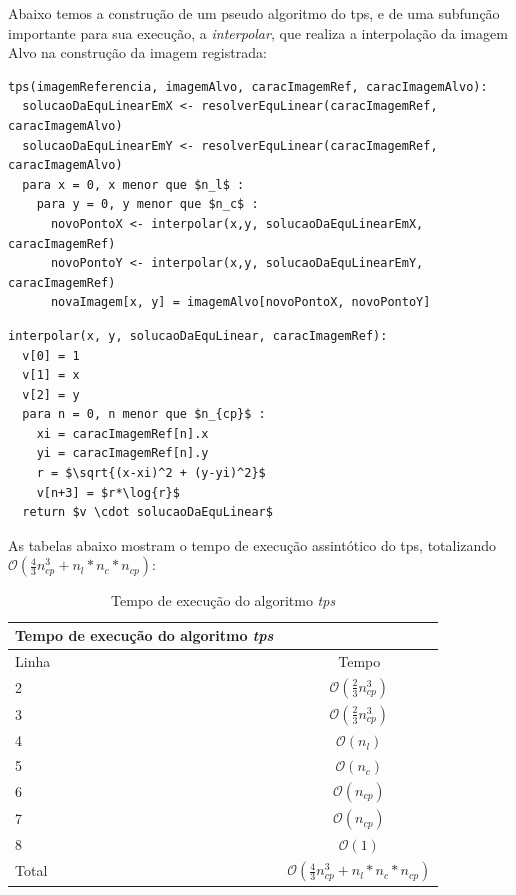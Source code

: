   Abaixo temos a construção de um pseudo algoritmo do tps, e de uma subfunção importante para sua execução, a 
\textit{interpolar}, que realiza a interpolação da imagem Alvo na construção da imagem registrada:

\begin{lstlisting}[mathescape]
tps(imagemReferencia, imagemAlvo, caracImagemRef, caracImagemAlvo):
  solucaoDaEquLinearEmX <- resolverEquLinear(caracImagemRef, caracImagemAlvo)
  solucaoDaEquLinearEmY <- resolverEquLinear(caracImagemRef, caracImagemAlvo)
  para x = 0, x menor que $n_l$ :
    para y = 0, y menor que $n_c$ :
      novoPontoX <- interpolar(x,y, solucaoDaEquLinearEmX, caracImagemRef)
      novoPontoY <- interpolar(x,y, solucaoDaEquLinearEmY, caracImagemRef)
      novaImagem[x, y] = imagemAlvo[novoPontoX, novoPontoY]
\end{lstlisting}

\begin{lstlisting}[mathescape]
interpolar(x, y, solucaoDaEquLinear, caracImagemRef):
  v[0] = 1
  v[1] = x
  v[2] = y
  para n = 0, n menor que $n_{cp}$ :
    xi = caracImagemRef[n].x
    yi = caracImagemRef[n].y
    r = $\sqrt{(x-xi)^2 + (y-yi)^2}$
    v[n+3] = $r*\log{r}$
  return $v \cdot solucaoDaEquLinear$ 
\end{lstlisting}

  As tabelas abaixo mostram o tempo de execução assintótico do tps, totalizando 
$\mathcal{O}(\frac{4}{3}n_{cp}^3+n_l*n_c*n_{cp})$:

\begin{table}[H]
\begin{center}
\begin{tabular}{l|c}
\hline
Tempo de execução do algoritmo \textit{tps} \\
\hline
Linha&Tempo\\
\hline
2       &$\mathcal{O}(\frac{2}{3}n_{cp}^3)$\\
3       &$\mathcal{O}(\frac{2}{3}n_{cp}^3)$\\
4       &$\mathcal{O}(n_l)$\\
5       &$\mathcal{O}(n_c)$\\
6       &$\mathcal{O}(n_{cp})$\\
7       &$\mathcal{O}(n_{cp})$\\
8       &$\mathcal{O}(1)$\\
\hline
Total   &$\mathcal{O}(\frac{4}{3}n_{cp}^3+n_l*n_c*n_{cp})$\\
\hline
\end{tabular}
\caption{Tempo de execução do algoritmo \textit{tps}}
\label{table:tps}
\end{center}
\end{table}

